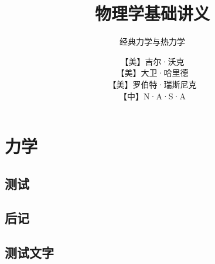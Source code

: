 \documentclass[themecolor=brown]{textbook-cn}
\title{物理学基础讲义}
\subtitle{经典力学与热力学}
\author{【美】吉尔·沃克\\【美】大卫·哈里德\\【美】罗伯特·瑞斯尼克\\【中】N·A·S·A}
\begin{document}



%

\maketitle

\lipsum[1-6]



\frontmatter
\lipsum


\shorttableofcontents
\tableofcontents

\listoffigures


\cleardoublepage

\lipsum[2]


\mainmatter


\partintro{\lipsum[2]}
\part[短标题]{力学}
\lipsum


%

%

%
%
%
%
%
%
%
%
%
%
%
%
%
\chapter{测试}
\zhlipsum[1]

\backmatter

%	


\chapter{后记}

\lipsum




\chapter{测试文字}
\zhlipsum
\end{document}
